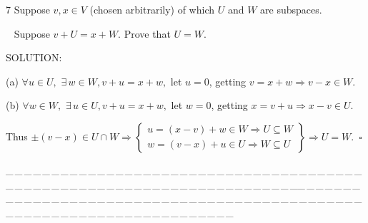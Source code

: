 \documentclass[a4paper, 11pt, UTF8]{article}
\begin{document}
\begin{large}
{\timesbf\Large 7} {\timessl\Large 
Suppose $v,x\in V$ (chosen arbitrarily) of which $U$ and $W$ are subspaces.}\par\,\,\,
{\timessl\Large Suppose $v+U=x+W$. Prove that $U=W$.
}\par
{\timesbf S\footnotesize{OLUTION:}}\par\quad
(a) $\forall u\in U,\,\,\exists\,w\in W,v+u=x+w,$ let $u=0$, getting $v=x+w\Rightarrow v-x\in W$.\par\quad
(b) $\forall w\in W,\,\,\exists\,u\in U,v+u=x+w,$ let $w=0$, getting $x=v+u\Rightarrow x-v\in U$.\par\quad
Thus $\pm(v-x)\in U\cap W \Rightarrow\left\{\begin{array}{l}u=(x-v)+w\in W\Rightarrow U\subseteq W\\w=(v-x)+u\in U\Rightarrow W\subseteq U\end{array}\right\}\Rightarrow U=W.\,\,\,\square$\par
{\tiny \_\,\_\,\_\,\_\,\_\,\_\,\_\,\_\,\_\,\_\,\_\,\_\,\_\,\_\,\_\,\_\,\_\,\_\,\_\,\_\,\_\,\_\,\_\,\_\,\_\,\_\,\_\,\_\,\_\,\_\,\_\,\_\,\_\,\_\,\_\,\_\,\_\,\_\,\_\,\_\,\_\,\_\,\_\,\_\,\_\,\_\,\_\,\_\,\_\,\_\,\_\,\_\,\_\,\_\,\_\,\_\,\_\,\_\,\_\,\_\,\_\,\_\,\_\,\_\,\_\,\_\,\_\,\_\,\_\,\_\,\_\_\,\_\,\_\,\_\,\_\,\_\,\_\,\_\,\_\,\_\,\_\,\_\,\_\,\_\,\_\,\_\,\_\,\_\,\_\,\_\,\_\,\_\,\_\,\_\,\_\,\_\,\_\,\_\,\_\,\_\,\_\,\_\,\_\,\_\,\_\,\_\,\_\,\_\,\_\,\_\,\_\,\_\,\_\,\_\,\_\,\_\,\_\,\_\,\_\,\_\,\_\,\_\,\_\,\_\,\_\,\_\,\_\,\_\,\_\,\_\,\_\,\_\,\_\,\_\,\_\,\_\,\_\,\_\,\_\,\_\,\_}\par


\end{large}
\end{document}

